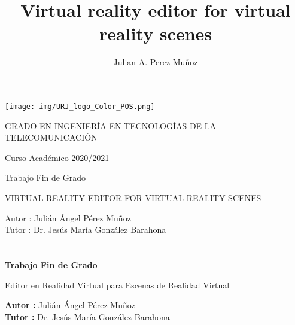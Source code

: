 \documentclass[a4paper, 12pt]{book}
\title{Virtual reality editor for virtual reality scenes}
\author{Julian A. Perez Muñoz}
\begin{document}
\renewcommand{\refname}{Bibliografía}  %
\renewcommand{\appendixname}{Apéndice}


\begin{titlepage}
\begin{center}
\texttt{[image: img/URJ\_logo\_Color\_POS.png]}

\vspace{1.75cm}

\Large
GRADO EN INGENIERÍA EN TECNOLOGÍAS DE LA TELECOMUNICACIÓN

\vspace{0.4cm}

\large
Curso Académico 2020/2021

\vspace{0.8cm}

Trabajo Fin de Grado

\vspace{2.5cm}

\LARGE
VIRTUAL REALITY EDITOR FOR VIRTUAL REALITY SCENES

\vspace{4cm}

\large
Autor : Julián Ángel Pérez Muñoz\\
Tutor : Dr. Jesús María González Barahona
\end{center}
\end{titlepage}

\newpage
\mbox{}
\thispagestyle{empty} %


\clearpage
{}
\chapter*{}

\vspace{-4cm}
\begin{center}
\LARGE
\textbf{Trabajo Fin de Grado}

\vspace{1cm}
\large
Editor en Realidad Virtual para Escenas de Realidad Virtual

\vspace{1cm}
\large
\textbf{Autor :} Julián Ángel Pérez Muñoz\\
\textbf{Tutor :} Dr. Jesús María González Barahona

\end{center}
\end{document}
